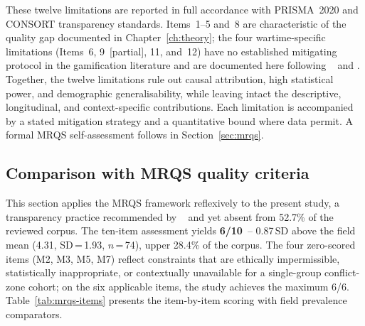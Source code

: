 These twelve limitations are reported in full accordance with PRISMA~2020 \cite{Page2021, Moher2009PRISMA} and CONSORT \cite{Schulz2010CONSORT} transparency standards. Items~1--5 and~8 are characteristic of the quality gap documented in Chapter~\ref{ch:theory}; the four wartime-specific limitations (Items~6, 9~[partial], 11, and~12) have no established mitigating protocol in the gamification literature and are documented here following \citeauthor{Burde2017}~\cite{Burde2017} and \cite{Kirk2007}. Together, the twelve limitations rule out causal attribution, high statistical power, and demographic generalisability, while leaving intact the descriptive, longitudinal, and context-specific contributions. Each limitation is accompanied by a stated mitigation strategy and a quantitative bound where data permit. A formal MRQS self-assessment follows in Section~\ref{sec:mrqs}.

\subsection{Comparison with MRQS quality criteria}

This section applies the MRQS framework \cite{Korniienko2025mrqs} reflexively to the present study, a transparency practice recommended by \citeauthor{HigginsThomas2019}~\cite{HigginsThomas2019} and \cite{Whiting2016} yet absent from 52.7\% of the reviewed corpus. The ten-item assessment yields \textbf{6/10}~-- 0.87\,SD above the field mean (4.31, SD\,=\,1.93, $n$\,=\,74), upper 28.4\% of the corpus. The four zero-scored items (M2, M3, M5, M7) reflect constraints that are ethically impermissible, statistically inappropriate, or contextually unavailable for a single-group conflict-zone cohort; on the six applicable items, the study achieves the maximum 6/6. Table~\ref{tab:mrqs-items} presents the item-by-item scoring with field prevalence comparators.

